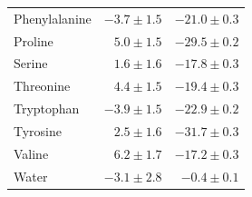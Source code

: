 \documentclass[9pt]{article}
\begin{document}
\begin{table}
{\begin{tabular}{lrr}
Phenylalanine     & $-3.7  \pm 1.5$       & $-21.0 \pm 0.3$ \\
Proline           & $5.0   \pm 1.5$       & $-29.5 \pm 0.2$ \\
Serine            & $1.6   \pm 1.6$       & $-17.8 \pm 0.3$ \\
Threonine         & $4.4   \pm 1.5$       & $-19.4 \pm 0.3$ \\
Tryptophan        & $-3.9  \pm 1.5$       & $-22.9 \pm 0.2$ \\
Tyrosine          & $2.5   \pm 1.6$       & $-31.7 \pm 0.3$ \\
Valine            & $6.2   \pm 1.7$       & $-17.2 \pm 0.3$ \\
Water             & $-3.1  \pm 2.8$       & $-0.4  \pm 0.1$ \\

\bottomrule
\end{tabular}
}
\end{table}
\end{document}
